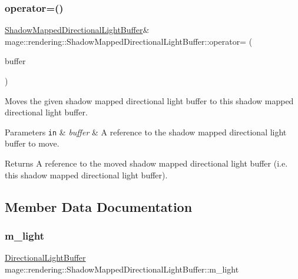 \subsubsection{\texorpdfstring{operator=()}{operator=()}\hspace{0.1cm}{\footnotesize\ttfamily [2/2]}}
{\footnotesize\ttfamily \hyperlink{structmage_1_1rendering_1_1_shadow_mapped_directional_light_buffer}{Shadow\+Mapped\+Directional\+Light\+Buffer}\& mage\+::rendering\+::\+Shadow\+Mapped\+Directional\+Light\+Buffer\+::operator= (\begin{DoxyParamCaption}\item[{\hyperlink{structmage_1_1rendering_1_1_shadow_mapped_directional_light_buffer}{Shadow\+Mapped\+Directional\+Light\+Buffer} \&\&}]{buffer }\end{DoxyParamCaption})\hspace{0.3cm}{\ttfamily [default]}}

Moves the given shadow mapped directional light buffer to this shadow mapped directional light buffer.


\begin{DoxyParams}[1]{Parameters}
\mbox{\tt in}  & {\em buffer} & A reference to the shadow mapped directional light buffer to move. \\
\hline
\end{DoxyParams}
\begin{DoxyReturn}{Returns}
A reference to the moved shadow mapped directional light buffer (i.\+e. this shadow mapped directional light buffer). 
\end{DoxyReturn}


\subsection{Member Data Documentation}
\hypertarget{structmage_1_1rendering_1_1_shadow_mapped_directional_light_buffer_a3aa791aa543feb7a92a42251ea6b655e}{}\label{structmage_1_1rendering_1_1_shadow_mapped_directional_light_buffer_a3aa791aa543feb7a92a42251ea6b655e} 
\subsubsection{\texorpdfstring{m\+\_\+light}{m\_light}}
{\footnotesize\ttfamily \hyperlink{structmage_1_1rendering_1_1_directional_light_buffer}{Directional\+Light\+Buffer} mage\+::rendering\+::\+Shadow\+Mapped\+Directional\+Light\+Buffer\+::m\+\_\+light}

